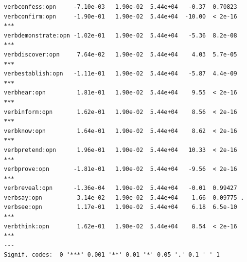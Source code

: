 \documentclass[10pt]{article}\usepackage[]{graphicx}\usepackage[]{color}
\makeatletter
\newenvironment{kframe}{%
 \def\at@end@of@kframe{}%
 \ifinner\ifhmode%
  \def\at@end@of@kframe{\end{minipage}}%
  \begin{minipage}{\columnwidth}%
 \fi\fi%
 \def\FrameCommand##1{\hskip\@totalleftmargin \hskip-\fboxsep
 \colorbox{shadecolor}{##1}\hskip-\fboxsep
     \hskip-\linewidth \hskip-\@totalleftmargin \hskip\columnwidth}%
 \MakeFramed {\advance\hsize-\width
   \@totalleftmargin\z@ \linewidth\hsize
   \@setminipage}}%
 {\par\unskip\endMakeFramed%
 \at@end@of@kframe}
\newenvironment{knitrout}{}{} %
\makeatother
\begin{document}
\begin{knitrout}
\begin{kframe}
\begin{verbatim}
verbconfess:opn     -7.10e-03   1.90e-02  5.44e+04   -0.37  0.70823    
verbconfirm:opn     -1.90e-01   1.90e-02  5.44e+04  -10.00  < 2e-16 ***
verbdemonstrate:opn -1.02e-01   1.90e-02  5.44e+04   -5.36  8.2e-08 ***
verbdiscover:opn     7.64e-02   1.90e-02  5.44e+04    4.03  5.7e-05 ***
verbestablish:opn   -1.11e-01   1.90e-02  5.44e+04   -5.87  4.4e-09 ***
verbhear:opn         1.81e-01   1.90e-02  5.44e+04    9.55  < 2e-16 ***
verbinform:opn       1.62e-01   1.90e-02  5.44e+04    8.56  < 2e-16 ***
verbknow:opn         1.64e-01   1.90e-02  5.44e+04    8.62  < 2e-16 ***
verbpretend:opn      1.96e-01   1.90e-02  5.44e+04   10.33  < 2e-16 ***
verbprove:opn       -1.81e-01   1.90e-02  5.44e+04   -9.56  < 2e-16 ***
verbreveal:opn      -1.36e-04   1.90e-02  5.44e+04   -0.01  0.99427    
verbsay:opn          3.14e-02   1.90e-02  5.44e+04    1.66  0.09775 .  
verbsee:opn          1.17e-01   1.90e-02  5.44e+04    6.18  6.5e-10 ***
verbthink:opn        1.62e-01   1.90e-02  5.44e+04    8.54  < 2e-16 ***
---
Signif. codes:  0 '***' 0.001 '**' 0.01 '*' 0.05 '.' 0.1 ' ' 1
\end{verbatim}
\end{kframe}
\end{knitrout}
\end{document}
